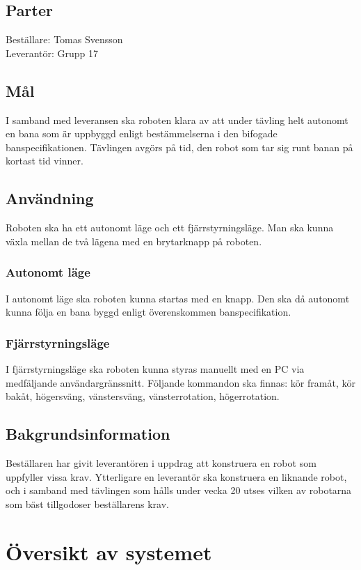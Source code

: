 \documentclass[a4paper,12pt]{article}
\begin{document}
\subsection{Parter}
Beställare: Tomas Svensson \\
Leverantör: Grupp 17

\subsection{Mål}
I samband med leveransen ska roboten klara av att under tävling helt autonomt 
 en bana som är uppbyggd enligt bestämmelserna i den bifogade banspecifikationen. 
 Tävlingen avgörs på tid, den robot som tar sig runt banan på kortast tid vinner.

\subsection{Användning}
Roboten ska ha ett autonomt läge och ett fjärrstyrningsläge.
Man ska kunna växla mellan de två lägena med en brytarknapp på roboten.

\subsubsection{Autonomt läge}
I autonomt läge ska roboten kunna startas med en knapp. Den ska då autonomt kunna följa en bana byggd enligt överenskommen banspecifikation.

\subsubsection{Fjärrstyrningsläge}
I fjärrstyrningsläge ska roboten kunna styras manuellt med en PC via medfäljande användargränssnitt.
Följande kommandon ska finnas: kör framåt, kör bakåt, högersväng, vänstersväng, vänsterrotation, högerrotation. 

\subsection{Bakgrundsinformation}
Beställaren har givit leverantören i uppdrag att konstruera en robot som uppfyller vissa krav.
Ytterligare en leverantör ska konstruera en liknande robot,
och i samband med tävlingen som hålls under vecka 20 utses vilken av robotarna som bäst tillgodoser beställarens krav.


\section{Översikt av systemet}
\end{document}
